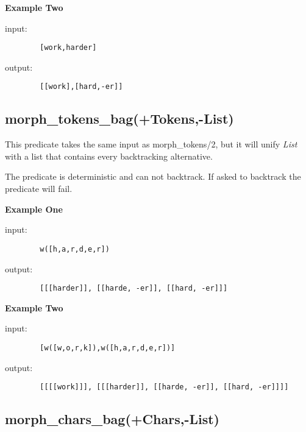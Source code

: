 \textbf{Example Two}\newline

input:

        \begin{verbatim}
        [work,harder]\end{verbatim}

output:

        \begin{verbatim}
        [[work],[hard,-er]]\end{verbatim}

\subsection{morph\_tokens\_bag(+Tokens,-List)}

This predicate takes the same input as morph\_tokens/2, but it
will unify \emph{List} with a list that contains every
backtracking alternative.\newline

The predicate is deterministic and can not backtrack.  If asked to
backtrack the predicate will fail.\newline


\textbf{Example One}\newline

input:

        \begin{verbatim}
        w([h,a,r,d,e,r])\end{verbatim}

output:

        \begin{verbatim}
        [[[harder]], [[harde, -er]], [[hard, -er]]]\end{verbatim}

\textbf{Example Two}\newline

input:

        \begin{verbatim}
        [w([w,o,r,k]),w([h,a,r,d,e,r])]\end{verbatim}

output:

        \begin{verbatim}
        [[[[work]]], [[[harder]], [[harde, -er]], [[hard, -er]]]]\end{verbatim}

\subsection{morph\_chars\_bag(+Chars,-List)}

